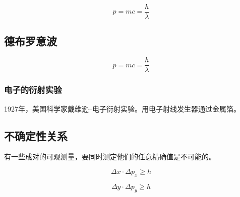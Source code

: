 \documentclass[a4paper]{ctexrep}
\begin{document}
    \[
        p = mc = \frac{h}{\lambda} 
    \]

    \subsection{德布罗意波}

    \[
        p = mc = \frac{h}{\lambda} 
    \]

    \subsubsection{电子的衍射实验}

    1927年，美国科学家戴维逊--电子衍射实验。用电子射线发生器通过金属箔。

    \subsection{不确定性关系}

    有一些成对的可观测量，要同时测定他们的任意精确值是不可能的。

    \[
        \Delta x \cdot \Delta p_x \geq h  
    \]

    \[
        \Delta y \cdot \Delta p_y \geq h  
    \]

    
\end{document}
